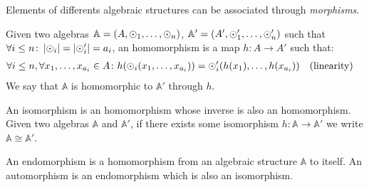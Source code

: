 Elements of differents algebraic structures can be associated through \emph{morphisms}.
\begin{definition}[Homomorphism]
  Given two algebras \(\mathbb{A} = \left(A, \odot_{1}, \dots, \odot_{n}\right)\), 
  \(\mathbb{A}' = \left(A', \odot'_{1}, \dots, \odot'_{n}\right)\) such that 
  \(\forall i \le n\colon \left\lvert\odot_i\right\rvert = \left\lvert\odot'_i\right\rvert = a_i\), an homomorphism is a map 
  \(h\colon A \to A'\) such that:
  \begin{align*}
    & \forall i \le n, \forall x_1,\dots, x_{a_{i}} \in A\colon 
    h(\odot_{i}(x_{1}, \dots, x_{a_{i}})) = \odot'_{i}(h(x_{1}), \dots, h(x_{a_{i}})) && 
    \textnormal{(linearity)}
  \end{align*}
  We say that \(\mathbb{A}\) is homomorphic to \(\mathbb{A}'\) through \(h\).
\end{definition}

\begin{definition}[Isomorphism]
  An isomorphism is an homomorphism whose inverse is also an homomorphism.
  Given two algebras \(\mathbb{A}\) and \(\mathbb{A}'\), if there exists some isomorphism 
  \(h\colon \mathbb{A} \to \mathbb{A}'\) we write \(\mathbb{A} \cong \mathbb{A}'\).
\end{definition}

\begin{definition}
  An endomorphism is a homomorphism from an algebraic structure \(\mathbb{A}\) to itself.
  An automorphism is an endomorphism which is also an isomorphism.
\end{definition}

